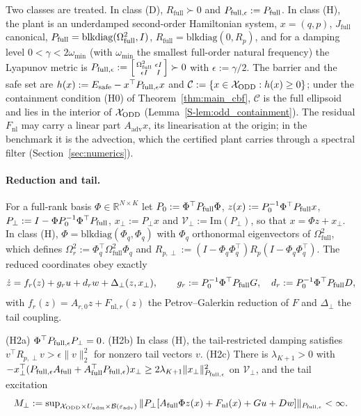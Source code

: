 Two classes are treated. In class (D), $R_{\mathrm{full}} \succ 0$ and $P_{\mathrm{full},\epsilon} := P_{\mathrm{full}}$. In class (H), the plant is an underdamped second-order Hamiltonian system, $x = (q,p)$, $J_{\mathrm{full}}$ canonical, $P_{\mathrm{full}} = \mathrm{blkdiag}(\Omega_{\mathrm{full}}^2, I)$, $R_{\mathrm{full}} = \mathrm{blkdiag}(0, R_p)$, and for a damping level $0 < \gamma < 2\omega_{\min}$ (with $\omega_{\min}$ the smallest full-order natural frequency) the Lyapunov metric is $P_{\mathrm{full},\epsilon} := \left[\begin{smallmatrix} \Omega_{\mathrm{full}}^2 & \epsilon I \\ \epsilon I & I \end{smallmatrix}\right] \succ 0$ with $\epsilon := \gamma/2$. The barrier and the safe set are $h(x) := E_{\mathrm{safe}} - x^\top P_{\mathrm{full},\epsilon} x$ and $\mathcal{C} := \{x \in \mathcal{X}_{\mathrm{ODD}} : h(x) \ge 0\}$; under the containment condition (H0) of Theorem~\ref{thm:main_cbf}, $\mathcal{C}$ is the full ellipsoid and lies in the interior of $\mathcal{X}_{\mathrm{ODD}}$ (Lemma~\ref{S-lem:odd_containment}). The residual $F_{\mathrm{nl}}$ may carry a linear part $A_{\mathrm{adv}}x$, its linearisation at the origin; in the benchmark it is the advection, which the certified plant carries through a spectral filter (Section~\ref{sec:numerics}).

\paragraph{Reduction and tail.}
For a full-rank basis $\Phi \in \mathbb{R}^{N\times K}$ let $P_0 := \Phi^\top P_{\mathrm{full}}\Phi$, $z(x) := P_0^{-1}\Phi^\top P_{\mathrm{full}} x$, $P_\perp := I - \Phi P_0^{-1}\Phi^\top P_{\mathrm{full}}$, $x_\perp := P_\perp x$ and $\mathcal{V}_\perp := \mathrm{Im}(P_\perp)$, so that $x = \Phi z + x_\perp$. In class (H), $\Phi = \mathrm{blkdiag}(\Phi_q, \Phi_q)$ with $\Phi_q$ orthonormal eigenvectors of $\Omega_{\mathrm{full}}^2$, which defines $\Omega_r^2 := \Phi_q^\top\Omega_{\mathrm{full}}^2\Phi_q$ and $R_{p,\perp} := (I - \Phi_q\Phi_q^\top)R_p(I - \Phi_q\Phi_q^\top)$. The reduced coordinates obey exactly
\begin{equation}
\label{eq:reduced}
\dot z = f_r(z) + g_r u + d_r w + \Delta_\perp(z, x_\perp), \qquad g_r := P_0^{-1}\Phi^\top P_{\mathrm{full}} G,\quad d_r := P_0^{-1}\Phi^\top P_{\mathrm{full}} D,
\end{equation}
with $f_r(z) = A_{r,0}z + F_{\mathrm{nl},r}(z)$ the Petrov--Galerkin reduction of $F$ and $\Delta_\perp$ the tail coupling.

\begin{assumption}[Tail]
\label{assump:tail}
(H2a) $\Phi^\top P_{\mathrm{full},\epsilon} P_\perp = 0$. (H2b) In class (H), the tail-restricted damping satisfies $v^\top R_{p,\perp}v > \epsilon\|v\|_2^2$ for nonzero tail vectors $v$. (H2c) There is $\lambda_{K+1} > 0$ with $-x_\perp^\top(P_{\mathrm{full},\epsilon}A_{\mathrm{full}} + A_{\mathrm{full}}^\top P_{\mathrm{full},\epsilon})x_\perp \ge 2\lambda_{K+1}\|x_\perp\|_{P_{\mathrm{full},\epsilon}}^2$ on $\mathcal{V}_\perp$, and the tail excitation
\[
M_\perp := \sup\nolimits_{\mathcal{X}_{\mathrm{ODD}}\times U_{\mathrm{adm}}\times\mathcal{B}(\varepsilon_{\mathrm{adv}})}\|P_\perp[A_{\mathrm{full}}\Phi z(x) + F_{\mathrm{nl}}(x) + Gu + Dw]\|_{P_{\mathrm{full},\epsilon}} < \infty .
\]
\end{assumption}

